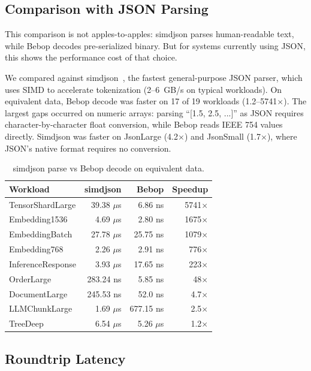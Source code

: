 \documentclass[10pt,onecolumn]{article}
\begin{document}
\subsection{Comparison with JSON Parsing}

This comparison is not apples-to-apples: simdjson parses human-readable text, while Bebop decodes pre-serialized binary. But for systems currently using JSON, this shows the performance cost of that choice.

We compared against simdjson~\cite{simdjson}, the fastest general-purpose JSON parser, which uses SIMD to accelerate tokenization (2--6~GB/s on typical workloads). On equivalent data, Bebop decode was faster on 17 of 19 workloads (1.2--5741$\times$). The largest gaps occurred on numeric arrays: parsing ``[1.5, 2.5, ...]'' as JSON requires character-by-character float conversion, while Bebop reads IEEE 754 values directly. Simdjson was faster on JsonLarge (4.2$\times$) and JsonSmall (1.7$\times$), where JSON's native format requires no conversion.

\begin{table}[ht]
\centering
\begin{tabular}{@{}lrrr@{}}
\toprule
\textbf{Workload} & \textbf{simdjson} & \textbf{Bebop} & \textbf{Speedup} \\
\midrule
TensorShardLarge & 39.38 $\mu$s & 6.86 ns & 5741$\times$ \\
Embedding1536 & 4.69 $\mu$s & 2.80 ns & 1675$\times$ \\
EmbeddingBatch & 27.78 $\mu$s & 25.75 ns & 1079$\times$ \\
Embedding768 & 2.26 $\mu$s & 2.91 ns & 776$\times$ \\
InferenceResponse & 3.93 $\mu$s & 17.65 ns & 223$\times$ \\
OrderLarge & 283.24 ns & 5.85 ns & 48$\times$ \\
DocumentLarge & 245.53 ns & 52.0 ns & 4.7$\times$ \\
LLMChunkLarge & 1.69 $\mu$s & 677.15 ns & 2.5$\times$ \\
TreeDeep & 6.54 $\mu$s & 5.26 $\mu$s & 1.2$\times$ \\
\bottomrule
\end{tabular}
\caption{simdjson parse vs Bebop decode on equivalent data.}
\label{tab:simdjson}
\end{table}

\subsection{Roundtrip Latency}
\end{document}
